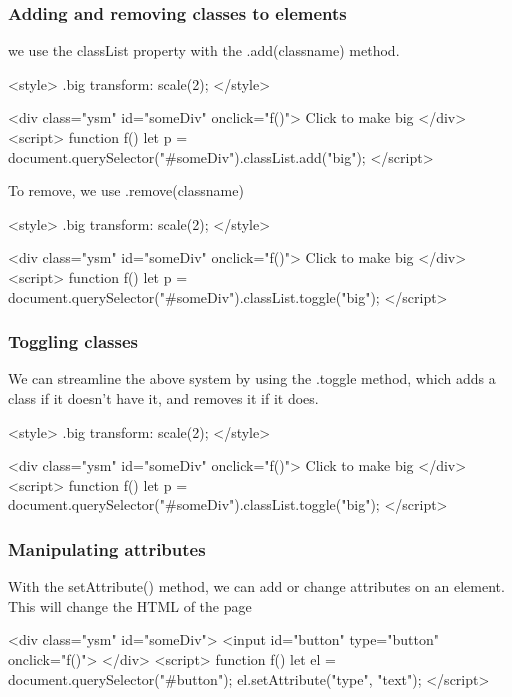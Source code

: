 \documentclass{report}
\begin{document}
\begin{jscode}
\bigbreak \noindent 
\subsubsection{Adding and removing classes to elements}
\bigbreak \noindent 
we use the classList property with the .add(classname) method.
\bigbreak \noindent 
\begin{jscode}
    <style> .big { transform: scale(2); } </style>

    <div class="ysm" id="someDiv" onclick="f()"> Click to make big </div>
    <script> 
    function f() {
        let p = document.querySelector("#someDiv").classList.add("big");
    }
    </script>
\end{jscode}
\bigbreak \noindent 
To remove, we use .remove(classname)
\bigbreak \noindent 
\begin{jscode}
    <style> .big { transform: scale(2); } </style>

    <div class="ysm" id="someDiv" onclick="f()"> Click to make big </div>
    <script> 
        function f() {
            let p = document.querySelector("#someDiv").classList.toggle("big");
        }
    </script>
\end{jscode}

\bigbreak \noindent 
\subsubsection{Toggling classes}
\bigbreak \noindent 
We can streamline the above system by using the .toggle method, which adds a class if it doesn't have it, and removes it if it does.
\bigbreak \noindent 
\begin{jscode}
    <style> .big { transform: scale(2); } </style>

    <div class="ysm" id="someDiv" onclick="f()"> Click to make big </div>
    <script> 
        function f() {
            let p = document.querySelector("#someDiv").classList.toggle("big");
        }
    </script>
\end{jscode}

\bigbreak \noindent 
\subsubsection{Manipulating attributes}
\bigbreak \noindent 
With the setAttribute() method, we can add or change attributes on an element.
This will change the HTML of the page
\bigbreak \noindent 
\begin{jscode}
    <div class="ysm" id="someDiv">  
        <input id="button" type="button" onclick="f()">
    </div>
    <script> 
        function f() {
            let el = document.querySelector("#button");
            el.setAttribute("type", "text");
        }
    </script>
\end{jscode}


\end{jscode}
\end{document}
